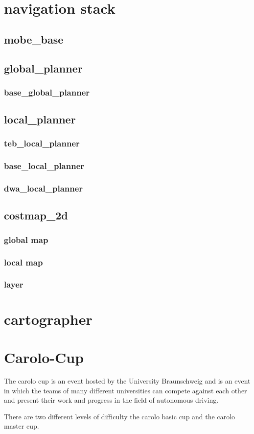 \section{navigation stack}
\subsection{mobe\_base}
\subsection{global\_planner}
\subsubsection{base\_global\_planner}
\subsection{local\_planner}
\subsubsection{teb\_local\_planner}
\subsubsection{base\_local\_planner}
\subsubsection{dwa\_local\_planner}
\subsection{costmap\_2d}
\subsubsection{global map}
\subsubsection{local map}
\subsubsection{layer}

\section{cartographer} 
\section{Carolo-Cup}
The carolo cup is an event hosted by the University Braunschweig and is an event in which the teams of many different universities can compete against each other and present their work and progress in the field of autonomous driving.

There are two different levels of difficulty the carolo basic cup and the carolo master cup.













